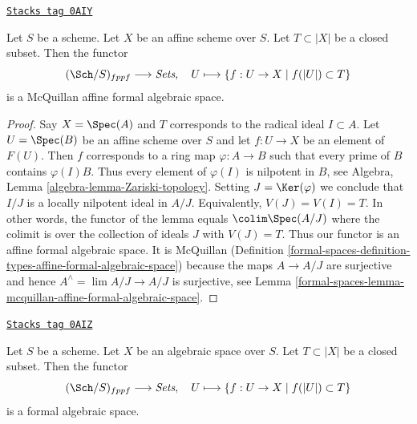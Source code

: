 \begin{lemma}
\label{formal-spaces-lemma-completion-affine-is-affine-formal-algebraic-space}
\href{https://stacks.math.columbia.edu/tag/0AIY}{\texttt{Stacks tag 0AIY}}

Let $S$ be a scheme. Let $X$ be an affine scheme over $S$.
Let $T \subset |X|$ be a closed subset. Then the functor
$$
(\Sch/S)_{fppf} \longrightarrow \textit{Sets},\quad
U \longmapsto \{f : U \to X \mid f(|U|) \subset T\}
$$
is a McQuillan affine formal algebraic space.
\end{lemma}

\begin{proof}
Say $X = \Spec(A)$ and $T$ corresponds to the radical ideal $I \subset A$.
Let $U = \Spec(B)$ be an affine scheme over $S$ and let
$f : U \to X$ be an element of $F(U)$. Then $f$ corresponds to a
ring map $\varphi : A \to B$ such that every prime of $B$ contains
$\varphi(I) B$. Thus every element of $\varphi(I)$ is nilpotent in $B$, see
Algebra, Lemma \ref{algebra-lemma-Zariski-topology}.
Setting $J = \Ker(\varphi)$ we conclude that $I/J$ is a locally nilpotent
ideal in $A/J$. Equivalently, $V(J) = V(I) = T$.
In other words, the functor of the lemma equals
$\colim \Spec(A/J)$ where the colimit is over the
collection of ideals $J$ with $V(J) = T$.
Thus our functor is an affine formal algebraic space. It is McQuillan
(Definition \ref{formal-spaces-definition-types-affine-formal-algebraic-space})
because the maps $A \to A/J$ are surjective
and hence $A^\wedge = \lim A/J \to A/J$ is surjective, see
Lemma \ref{formal-spaces-lemma-mcquillan-affine-formal-algebraic-space}.
\end{proof}

\begin{lemma}
\label{formal-spaces-lemma-completion-is-formal-algebraic-space}
\href{https://stacks.math.columbia.edu/tag/0AIZ}{\texttt{Stacks tag 0AIZ}}

Let $S$ be a scheme. Let $X$ be an algebraic space over $S$.
Let $T \subset |X|$ be a closed subset. Then the functor
$$
(\Sch/S)_{fppf} \longrightarrow \textit{Sets},\quad
U \longmapsto \{f : U \to X \mid f(|U|) \subset T\}
$$
is a formal algebraic space.
\end{lemma}

